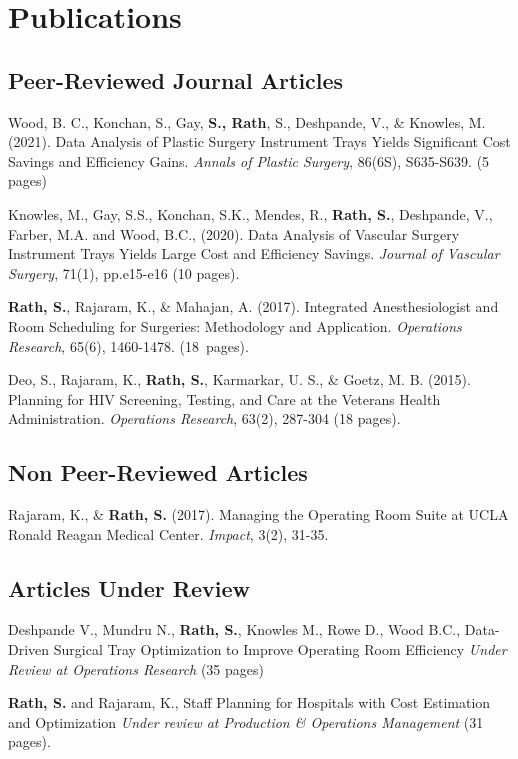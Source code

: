\documentclass[11pt,a4paper]{article}
\renewenvironment{itemize}{
	\begin{list}{}{
			\setlength{\leftmargin}{1.5em}
		}
	}{
\end{list}
}
\begin{document}
	\section*{\textbf{Publications}}

	\subsection*{Peer-Reviewed Journal Articles}

	\begin{itemize}
		\item Wood, B. C., Konchan, S., Gay, \textbf{S., Rath}, S., Deshpande, V., \& Knowles, M. (2021). Data Analysis of Plastic Surgery Instrument Trays Yields Significant Cost Savings and Efficiency Gains. \emph{Annals of Plastic Surgery}, 86(6S), S635-S639. (5 pages)
		\item Knowles, M., Gay, S.S., Konchan, S.K., Mendes, R., \textbf{Rath, S.}, Deshpande, V., Farber, M.A. and Wood, B.C., (2020). Data Analysis of Vascular Surgery Instrument Trays Yields Large Cost and Efficiency Savings. \emph{Journal of Vascular Surgery}, 71(1), pp.e15-e16 (10 pages).
		\item \textbf{Rath, S.}, Rajaram, K., \& Mahajan, A. (2017). Integrated Anesthesiologist and Room Scheduling for Surgeries: Methodology and Application. \emph{Operations Research}, 65(6), 1460-1478. \mbox{(18 pages)}.
		\item Deo, S., Rajaram, K., \textbf{Rath, S.}, Karmarkar, U. S., \& Goetz, M. B. (2015). Planning for HIV Screening, Testing, and Care at the Veterans Health Administration. \emph{Operations Research}, 63(2), 287-304 (18 pages).
	\end{itemize}
\subsection*{Non Peer-Reviewed Articles}

\begin{itemize}
	\item Rajaram, K., \& \textbf{Rath, S.} (2017). Managing the Operating Room Suite at UCLA Ronald Reagan Medical Center. \emph{Impact}, 3(2), 31-35.
\end{itemize}
\subsection*{Articles Under Review}
\begin{itemize}
	\item Deshpande V., Mundru N., \textbf{Rath, S.}, Knowles M., Rowe D., Wood B.C.,  Data-Driven Surgical Tray Optimization to Improve Operating Room Efficiency \emph{Under Review at Operations Research} (35 pages)
	\item \textbf{Rath, S.} and Rajaram, K.,  Staff Planning for Hospitals with Cost Estimation and
	Optimization \emph{Under  review at Production \& Operations  Management} (31 pages).
\end{itemize}
\end{document}
